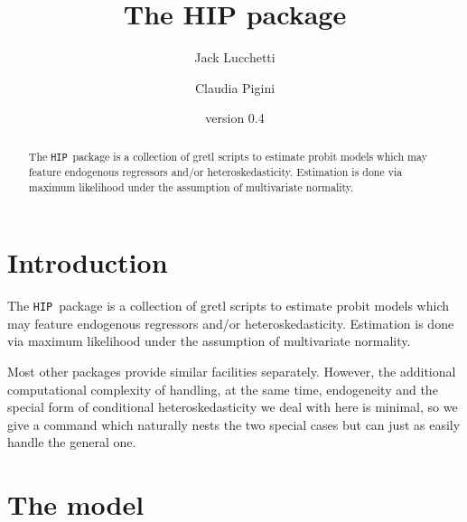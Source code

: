\documentclass[a4paper,10pt]{article}
\title{The HIP package}
\author{Jack Lucchetti \and Claudia Pigini}
\date{version 0.4}
\newcommand{\app}[1]{\textsf{#1}}
\newcounter{script}[section]
\newcommand{\HIP}{\texttt{HIP}}
\begin{document}
\maketitle

\begin{abstract}
The \HIP\ package is a collection of \app{gretl} scripts to estimate
probit models which may feature endogenous regressors and/or
heteroskedasticity. Estimation is done via maximum likelihood under
the assumption of multivariate normality.
\end{abstract}

\tableofcontents

\section{Introduction}
The \HIP\ package is a collection of \app{gretl} scripts to estimate
probit models which may feature endogenous regressors and/or
heteroskedasticity. Estimation is done via maximum likelihood under
the assumption of multivariate normality.

Most other packages provide similar facilities separately. However,
the additional computational complexity of handling, at the same time,
endogeneity and the special form of conditional heteroskedasticity we
deal with here is minimal, so we give a command which naturally nests
the two special cases but can just as easily handle the general one.

\section{The model}
\label{sec:model}
\end{document}

